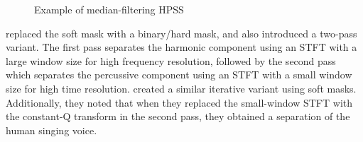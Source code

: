\documentclass[letter,12pt]{article}
\begin{document}
\begin{figure}[ht]
	\centering
	\caption{Example of median-filtering HPSS}
	\label{fig:fitz1}
\end{figure}

\citet{driedger} replaced the soft mask with a binary/hard mask, and also introduced a two-pass variant. The first pass separates the harmonic component using an STFT with a large window size for high frequency resolution, followed by the second pass which separates the percussive component using an STFT with a small window size for high time resolution. \citet{fitzgerald2} created a similar iterative variant using soft masks. Additionally, they noted that when they replaced the small-window STFT with the constant-Q transform in the second pass, they obtained a separation of the human singing voice.
\end{document}
